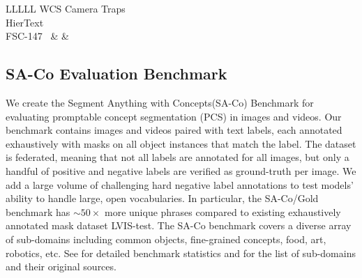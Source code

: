 \documentclass[]{fairmeta}
\newcommand{\dsnamelong}{Segment Anything with Concepts\xspace}
\newcommand{\dsname}{{SA-Co}\xspace}
\newcommand{\evalgold}{{\dsname/Gold}\xspace}
\begin{document}
\begin{table}[b]
{\begin{NiceTabular}{LLLLL}
{			{WCS Camera Traps~\citep{WCS}} \\
			{HierText~\citep{long2023icdar, long2022towards}} \\
			{FSC-147~\citep{fsc147}}
		} &
		 &
		 \\
	\end{NiceTabular}
}
\caption{Media pool used to construct each \dsname train subset. See~ for examples of each domain and annotations.} %
\label{table:train_dataset_sources}
\end{table}


\subsection{\dsname Evaluation Benchmark}\label{app:benchmark}
We create the \dsnamelong (\dsname) Benchmark for evaluating promptable concept segmentation (PCS) in images and videos. Our benchmark contains images and videos paired with text labels, each annotated exhaustively with masks on all object instances that match the label. The dataset is federated, meaning that not all labels are annotated for all images, but only a handful of positive and negative labels are verified as ground-truth per image. We add a large volume of challenging hard negative label annotations to test models' ability to handle large, open vocabularies. In particular, the \evalgold benchmark has $\sim50\times$ more unique phrases compared to existing exhaustively annotated mask dataset LVIS-test. The \dsname benchmark covers a diverse array of sub-domains including common objects, fine-grained concepts, food, art, robotics, etc. See  for detailed benchmark statistics and  for the list of sub-domains and their original sources.
\end{document}
